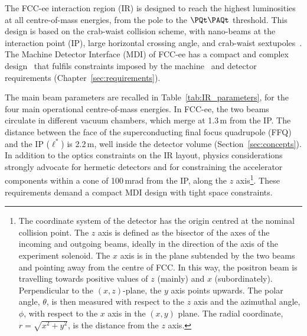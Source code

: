 The FCC-ee interaction region (IR) is designed to reach the highest luminosities 
at all centre-of-mass energies, from the \PZ pole to the $\ttbar$ threshold. 
This design is based on the crab-waist collision scheme, 
with nano-beams at the interaction point (IP), 
large horizontal crossing angle, and crab-waist sextupoles~\cite{Raimondi:2007vi}. 
The Machine Detector Interface (MDI) of FCC-ee has a 
compact and complex design~\cite{FCC-PED-FSR-Vol2,Boscolo:2024bxm} 
that fulfils constraints imposed by 
the machine~\cite{FCC-PED-FSR-Vol2} and detector requirements (Chapter~\ref{sec:requirements}). 

The main beam parameters are recalled in Table~\ref{tab:IR_parameters},
for the four main operational centre-of-mass energies.
In FCC-ee, the two beams circulate in different vacuum chambers, which merge at 1.3\,m from the IP. 
The distance between the face of the  superconducting final focus quadrupole (FFQ) 
and the IP (${\ell^{*}}$) is 2.2\,m, 
well inside the detector volume (Section~\ref{sec:concepts}). 
In addition to the optics constraints on the IR layout, 
physics considerations strongly advocate for hermetic detectors 
and for constraining
the accelerator components within a cone of 100\,mrad from the IP, 
along the $z$ axis\footnote{The coordinate system of the detector 
has the origin centred at the nominal collision point. 
The $z$ axis is defined as the bisector of the axes of the incoming and outgoing beams, 
ideally in the direction of the axis of the experiment solenoid. 
The $x$ axis is in the plane subtended by the two beams and pointing away from the centre of FCC. 
In this way, the positron beam is travelling towards positive values of $z$ (mainly) and $x$ (subordinately). 
Perpendicular to the $(x,z)$-plane, the $y$ axis points upwards. 
The polar angle, $\theta$, is then measured with respect to the $z$ axis 
and the azimuthal angle, $\phi$, with respect to the $x$ axis in the $(x,y)$ plane. 
The radial coordinate, $r=\sqrt{x^2+y^2}$, is the distance from the $z$ axis.}.
These requirements demand a compact MDI design with tight space constraints.

